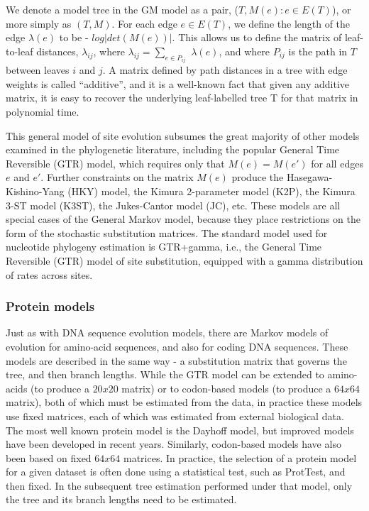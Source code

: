 We denote a model tree in the GM model as a pair, ($T, {M(e): e \in E(T)}$), or more
simply as $(T, M)$. For each edge $e \in E(T)$, we define the length of the edge $\lambda(e)$ to
be - $log |det(M(e))|$. This allows us to define the matrix of leaf-to-leaf distances, ${\lambda_{ij}}$,
where $\lambda_{ij} = \sum_{e \in P_{ij}}$
$\lambda(e)$, and where $P_{ij}$ is the path in $T$ between leaves $i$ and $j$. A
matrix defined by path distances in a tree with edge weights is called ``additive'', and it
is a well-known fact that given any additive matrix, it is easy to recover the underlying
leaf-labelled tree T for that matrix in polynomial time.

This general model of site evolution subsumes the great majority of other models
examined in the phylogenetic literature, including the popular General Time Reversible
(GTR) model, which requires only that $M(e) = M(e')$
for all edges $e$ and $e'$. 
Further constraints on the matrix $M(e)$ produce the Hasegawa-Kishino-Yang (HKY) model,
the Kimura 2-parameter model (K2P), the Kimura 3-ST model (K3ST), the Jukes-Cantor
model (JC), etc. These models are all special cases of the General Markov model, because
they place restrictions on the form of the stochastic substitution matrices. The standard
model used for nucleotide phylogeny estimation is GTR+gamma, i.e., the General Time
Reversible (GTR) model of site substitution, equipped with a gamma distribution of rates
across sites.

\subsubsection{Protein models}
Just as with DNA sequence evolution models, there are Markov
models of evolution for amino-acid sequences, and also for coding DNA sequences. These
models are described in the same way - a substitution matrix that governs the tree,
and then branch lengths. While the GTR model can be extended to amino-acids (to
produce a $20x20$ matrix) or to codon-based models (to produce a $64x64$ matrix), both
of which must be estimated from the data, in practice these models use fixed matrices,
each of which was estimated from external biological data. The most well known protein
model is the Dayhoff model, but improved models have been developed in recent
years. Similarly, codon-based models have also been based on fixed $64x64$
matrices. In practice, the selection of a protein model for a given dataset
is often done using a statistical test, such as ProtTest, and then fixed. In the
subsequent tree estimation performed under that model, only the tree and its branch
lengths need to be estimated.

